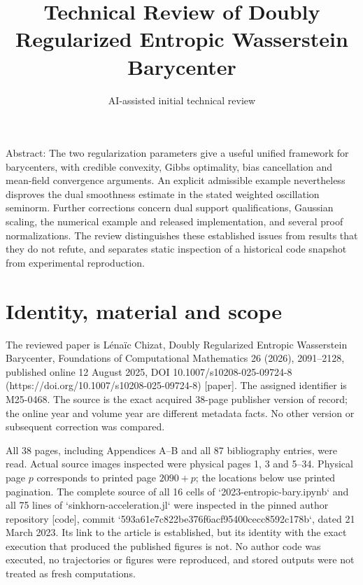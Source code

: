 \documentclass[10pt]{article}
\title{Technical Review of
Doubly Regularized Entropic Wasserstein Barycenter}
\author{AI-assisted initial technical review}
\date{}
\begin{document}
\maketitle
Abstract: The two regularization parameters give a useful unified framework for barycenters, with credible convexity, Gibbs optimality, bias cancellation and mean-field convergence arguments. An explicit admissible example nevertheless disproves the dual smoothness estimate in the stated weighted oscillation seminorm. Further corrections concern dual support qualifications, Gaussian scaling, the numerical example and released implementation, and several proof normalizations. The review distinguishes these established issues from results that they do not refute, and separates static inspection of a historical code snapshot from experimental reproduction.\par
\section*{Identity, material and scope}
The reviewed paper is Lénaïc Chizat, Doubly Regularized Entropic Wasserstein Barycenter, Foundations of Computational Mathematics 26 (2026), 2091–2128, published online 12 August 2025, DOI 10.1007/s10208-025-09724-8 (https://doi.org/10.1007/s10208-025-09724-8) [paper]. The assigned identifier is M25-0468. The source is the exact acquired 38-page publisher version of record; the online year and volume year are different metadata facts. No other version or subsequent correction was compared.\par
All 38 pages, including Appendices A–B and all 87 bibliography entries, were read. Actual source images inspected were physical pages 1, 3 and 5–34. Physical page \(p\) corresponds to printed page \(2090+p\); the locations below use printed pagination. The complete source of all 16 cells of `2023-entropic-bary.ipynb` and all 75 lines of `sinkhorn-acceleration.jl` were inspected in the pinned author repository [code], commit `593a61e7c822be376f6acf95400cecc8592c178b`, dated 21 March 2023. Its link to the article is established, but its identity with the exact execution that produced the published figures is not. No author code was executed, no trajectories or figures were reproduced, and stored outputs were not treated as fresh computations.\par
\end{document}
